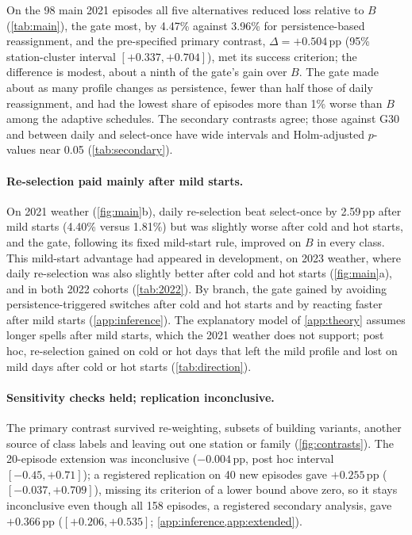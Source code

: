 \documentclass{article}
\newcommand{\pp}{\,pp}
\begin{document}
On the 98 main 2021 episodes all five alternatives reduced loss relative to $B$ (\cref{tab:main}), the gate most, by 4.47\%
against 3.96\% for persistence-based reassignment, and the pre-specified primary contrast, $\Delta = +0.504$\pp{}
(95\% station-cluster interval $[+0.337, +0.704]$), met its success criterion; the difference is modest, about a ninth of the gate's gain over $B$. The gate made
about as many profile changes as persistence, fewer than half those of daily reassignment, and had the lowest share of
episodes more than 1\% worse than $B$ among the adaptive schedules. The secondary \mbox{contrasts} agree; those against G30
and between daily and select-once have wide intervals and Holm-adjusted $p$-values
near 0.05 (\cref{tab:secondary}).

\paragraph{Re-selection paid mainly after mild starts.}\label{sec:regime}
On 2021 weather (\cref{fig:main}b), daily re-selection
beat select-once by 2.59\pp{} after mild starts (4.40\% versus 1.81\%) but was slightly worse after cold and hot starts,
and the gate, following its fixed mild-start rule, improved on $B$ in every class. This mild-start advantage had appeared in development, on 2023
weather, where daily re-selection was also slightly better after cold and hot starts (\cref{fig:main}a), and in both 2022 cohorts (\cref{tab:2022}). By branch, the gate gained by avoiding persistence-triggered switches after cold and
hot starts and by reacting faster after mild starts (\cref{app:inference}). The explanatory model of \cref{app:theory}
assumes longer spells after mild starts, which the 2021 weather does not support; post hoc, re-selection gained on cold or hot
days that left the mild profile and lost on mild days after cold or hot starts (\cref{tab:direction}).

\paragraph{Sensitivity checks held; replication inconclusive.}
The primary contrast survived re-weighting, subsets of building variants, another source of class labels and leaving out
one station or family (\cref{fig:contrasts}). The 20-episode extension was inconclusive ($-0.004$\pp, post hoc interval $[-0.45, +0.71]$); a registered replication
on 40 new episodes gave $+0.255$\pp{} ($[-0.037, +0.709]$), missing
its criterion of a lower bound above zero, so it stays inconclusive even though all 158 episodes, a registered secondary analysis, gave $+0.366$\pp{} ($[+0.206, +0.535]$;
\cref{app:inference,app:extended}).
\end{document}
